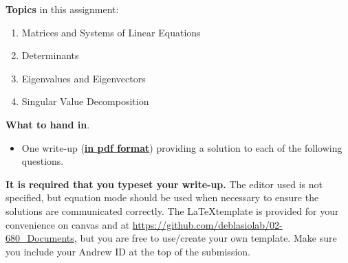 \noindent 
{\bf Topics} in this assignment: 
\begin{enumerate}
\item Matrices and Systems of Linear Equations
\item Determinants
\item Eigenvalues and Eigenvectors
\item Singular Value Decomposition
\end{enumerate}
\vspace{0.2in}


\noindent 
{\bf What to hand in}. 
\begin{itemize}
\item One write-up (\underline{\textbf{in pdf format}}) providing a solution to each of the following questions.
\end{itemize}

\textbf{It is required that you typeset your write-up.} 
The editor used is not specified, but equation mode should be used when necessary to ensure the solutions are communicated correctly.
The \LaTeX template is provided for your convenience on canvas and at \url{https://github.com/deblasiolab/02-680_Documents}, but you are free to use/create your own template. 
Make sure you include your Andrew ID at the top of the submission.\\

